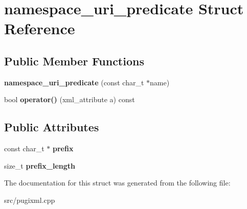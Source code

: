 \hypertarget{structnamespace__uri__predicate}{}\section{namespace\+\_\+uri\+\_\+predicate Struct Reference}
\label{structnamespace__uri__predicate}
\subsection*{Public Member Functions}
\begin{DoxyCompactItemize}
\item 
\mbox{\label{structnamespace__uri__predicate_a25bef9c1e12b0fdc908275ae7ab7c202}} 
{\bfseries namespace\+\_\+uri\+\_\+predicate} (const char\+\_\+t $\ast$name)
\item 
\mbox{\label{structnamespace__uri__predicate_abeb31bcbfaa60f9cee21a4dc6cb59073}} 
bool {\bfseries operator()} (xml\+\_\+attribute a) const
\end{DoxyCompactItemize}
\subsection*{Public Attributes}
\begin{DoxyCompactItemize}
\item 
\mbox{\label{structnamespace__uri__predicate_a80a2c051b9e57b8895c28d8fcc32e051}} 
const char\+\_\+t $\ast$ {\bfseries prefix}
\item 
\mbox{\label{structnamespace__uri__predicate_aa48279192e8d48b9c798f5485a2a9170}} 
size\+\_\+t {\bfseries prefix\+\_\+length}
\end{DoxyCompactItemize}


The documentation for this struct was generated from the following file\+:\begin{DoxyCompactItemize}
\item 
src/pugixml.\+cpp\end{DoxyCompactItemize}
